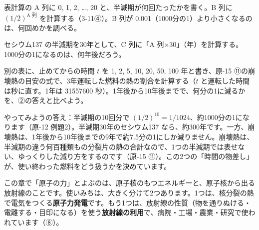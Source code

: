 \begin{yattemiyou}
\begin{enumerate}[label={\bkcircled[bkGreen]{\arabic*}}, leftmargin=2.4\zw, itemsep=1pt, topsep=2pt]
\item 表計算の A 列に 0, 1, 2, …, 20 と、半減期が何回たったかを書く。B 列に $(1/2)^{\text{A 列}}$ を計算する（3-11④）。B 列が 0.001（1000分の1）より小さくなるのは、何回めかを調べる。
\item セシウム137 の半減期を30年として、C 列に「A 列×30」（年）を計算する。1000分の1になるのは、何年後だろう。
\item 別の表に、止めてからの時間 $t$ を 1, 2, 5, 10, 20, 50, 100 年と書き、原-15 ⑪の崩壊熱の目安の式で、3年運転した燃料の熱の割合を計算する（$t$ と運転した時間は秒に直す。1年は \num{31557600} 秒）。1年後から10年後までで、何分の1に減るかを、②の答えと比べよう。
\end{enumerate}
\end{yattemiyou}

\noindent やってみようの答え：半減期の10回分で $(1/2)^{10}=1/1024$、約1000分の1になります（原-12 例題2）。半減期30年のセシウム137 なら、約300年です。一方、崩壊熱は、1年後から10年後までの9年で約7.5分の1にしか減りません。崩壊熱は、半減期の違う何百種類もの分裂片の熱の合計なので、1つの半減期では表せない、ゆっくりした減り方をするのです（原-15 ⑪）。この2つの「時間の物差し」が、使い終わった燃料をどう扱うかを決めています。

\begin{omoidasou}
\end{omoidasou}


\leavevmode\label{ph:原-16:sec1}この章で「原子の力」とよぶのは、原子核のもつエネルギーと、原子核から出る放射線のことです。使いみちは、大きく分けて2つあります。1つは、核分裂の熱で電気をつくる\textbf{原子力発電}です。もう1つは、放射線の性質（物を通りぬける・電離する・目印になる）を使う\textbf{放射線の利用}で、病院・工場・農業・研究で使われています（⑧）。

